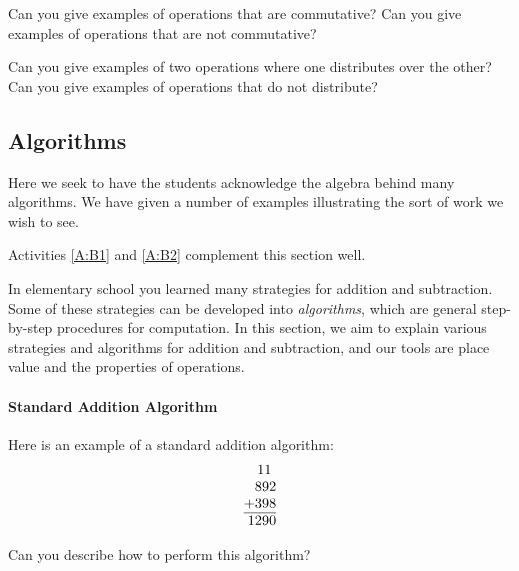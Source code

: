 \begin{question}
Can you give examples of operations that are commutative? Can you give
examples of operations that are not commutative?
\end{question}
\QM


\begin{question}
Can you give examples of two operations where one distributes over the
other? Can you give examples of operations that do not distribute?
\end{question}
\QM



\subsection{Algorithms}

\begin{teachingnote}
Here we seek to have the students acknowledge the algebra behind many
algorithms. We have given a number of examples illustrating the sort
of work we wish to see.
\end{teachingnote}


\begin{activitynote}
Activities \ref{A:B1} and \ref{A:B2} complement  this section well.  %
\end{activitynote}

In elementary school you learned many strategies for addition and subtraction.  
Some of these strategies can be developed into \emph{algorithms}, which are general step-by-step procedures 
for computation.  In this section, we aim to explain various strategies and algorithms for addition and subtraction, and our tools are place value and the properties of operations.

\paragraph{Standard Addition Algorithm}
Here is an example of a standard addition algorithm:
\[
\begin{tabular}{@{}r@{}}
11~~\\
892\\
+398\\ \hline
1290
\end{tabular}
\]

\begin{question}
Can you describe how to perform this algorithm?
\end{question}

